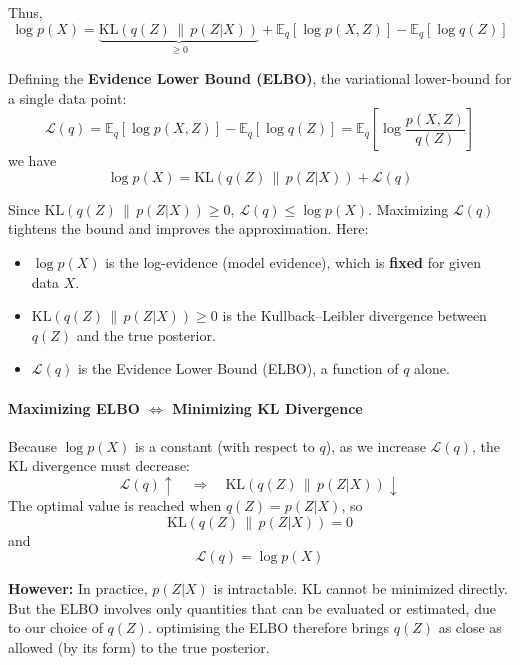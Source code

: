 Thus,
\begin{equation}
\log p(X) = \underbrace{\mathrm{KL}(q(Z) \,\|\, p(Z|X))}_{\geq 0} + \mathbb{E}_q [\log p(X, Z)] - \mathbb{E}_q [\log q(Z)]
\end{equation}

Defining the \textbf{Evidence Lower Bound (ELBO)}, the variational lower-bound for a single data point:
\begin{equation}
\mathcal{L}(q) = \mathbb{E}_q [\log p(X, Z)] - \mathbb{E}_q [\log q(Z)] = \mathbb{E}_{q}\left[\log \frac{p(X, Z)}{q(Z)}\right]
\end{equation}
we have
\begin{equation}
\log p(X) = \mathrm{KL}(q(Z) \,\|\, p(Z|X)) + \mathcal{L}(q)
\end{equation}

Since \( \mathrm{KL}(q(Z) \,\|\, p(Z|X)) \geq 0 \), \( \mathcal{L}(q) \leq \log p(X) \). Maximizing \(\mathcal{L}(q)\) tightens the bound and improves the approximation.
Here:
\begin{itemize}
    \item $\log p(X)$ is the log-evidence (model evidence), which is \textbf{fixed} for given data $X$.
    \item $\mathrm{KL}(q(Z)\,\|\,p(Z|X)) \ge 0$ is the Kullback--Leibler divergence between $q(Z)$ and the true posterior.
    \item $\mathcal{L}(q)$ is the Evidence Lower Bound (ELBO), a function of $q$ alone.
\end{itemize}

\paragraph{Maximizing ELBO $\Longleftrightarrow$ Minimizing KL Divergence}
Because $\log p(X)$ is a constant (with respect to $q$), as we increase $\mathcal{L}(q)$, the KL divergence must decrease:
\begin{equation}
\mathcal{L}(q)\uparrow \quad \Longrightarrow\quad \mathrm{KL}(q(Z)\,\|\,p(Z|X))\downarrow
\end{equation}
The optimal value is reached when $q(Z) = p(Z|X)$, so
\begin{equation}
\mathrm{KL}(q(Z)\,\|\,p(Z|X)) = 0
\end{equation}
and
\begin{equation}
\mathcal{L}(q) = \log p(X)
\end{equation}

\noindent
\textbf{However:} In practice, $p(Z|X)$ is intractable. KL cannot be minimized directly. But the ELBO involves only quantities that can be evaluated or estimated, due to our choice of $q(Z)$. optimising the ELBO therefore brings $q(Z)$ as close as allowed (by its form) to the true posterior.

